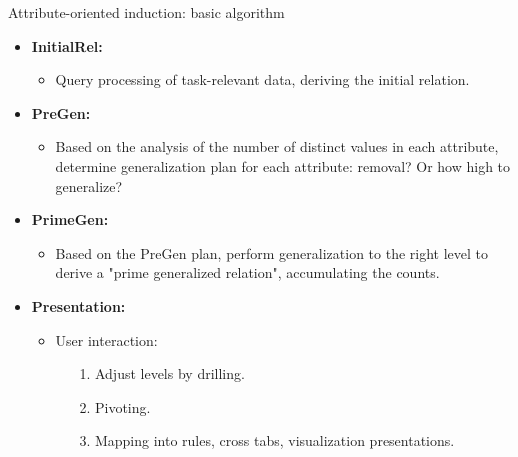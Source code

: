 \documentclass[aspectratio=169,t]{beamer}
\begin{document}
  { 
    \begin{frame}{Attribute-oriented induction: basic algorithm }
    \begin{itemize}
      \item \textbf{InitialRel:}
      \begin{itemize}
        \item Query processing of task-relevant data, deriving the initial relation.
      \end{itemize}
      \item \textbf{PreGen:}
      \begin{itemize}
        \item Based on the analysis of the number of distinct values in each attribute, determine generalization plan for each attribute: removal? Or how high to generalize?
      \end{itemize}
      \item \textbf{PrimeGen:}
      \begin{itemize}
        \item Based on the PreGen plan, perform generalization to the right level to derive a "prime generalized relation", accumulating the counts.
      \end{itemize}
      \item \textbf{Presentation:}
      \begin{itemize}
        \item User interaction:
        \begin{itemize}
          \item[1.] Adjust levels by drilling.
          \item[2.] Pivoting.
          \item[3.] Mapping into rules, cross tabs, visualization presentations.
        \end{itemize}
      \end{itemize}
    \end{itemize}
    \end{frame}
  }
\end{document}
